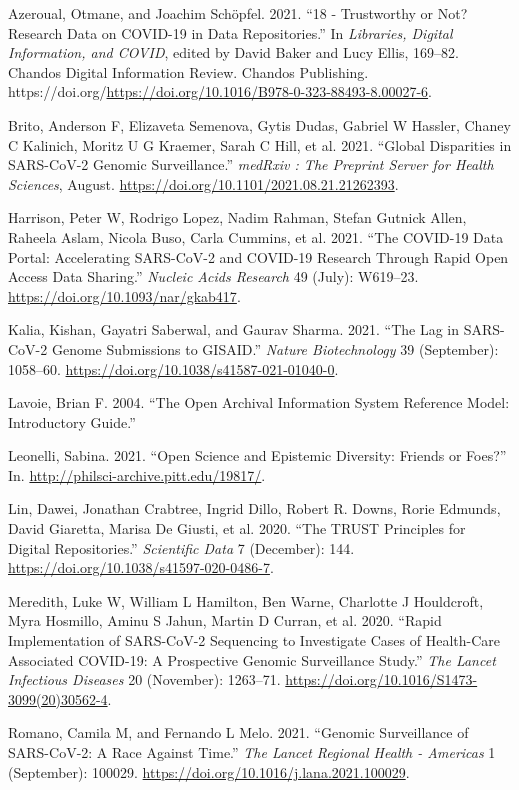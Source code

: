 \documentclass{article}
\newlength{\cslhangindent}
\newlength{\cslentryspacingunit} %
\newenvironment{CSLReferences}[2] %
 {%
  \setlength{\parindent}{0pt}
  \ifodd #1
  \let\oldpar\par
  \def\par{\hangindent=\cslhangindent\oldpar}
  \fi
  \setlength{\parskip}{#2\cslentryspacingunit}
 }%
 {}
\begin{document}
\hypertarget{refs}{}
\begin{CSLReferences}{1}{0}
\leavevmode\hypertarget{ref-AZEROUAL2021169}{}%
Azeroual, Otmane, and Joachim Schöpfel. 2021. {``18 - Trustworthy or
Not? Research Data on COVID-19 in Data Repositories.''} In
\emph{Libraries, Digital Information, and COVID}, edited by David Baker
and Lucy Ellis, 169--82. Chandos Digital Information Review. Chandos
Publishing.
https://doi.org/\url{https://doi.org/10.1016/B978-0-323-88493-8.00027-6}.

\leavevmode\hypertarget{ref-Brito2021}{}%
Brito, Anderson F, Elizaveta Semenova, Gytis Dudas, Gabriel W Hassler,
Chaney C Kalinich, Moritz U G Kraemer, Sarah C Hill, et al. 2021.
{``Global Disparities in SARS-CoV-2 Genomic Surveillance.''}
\emph{medRxiv : The Preprint Server for Health Sciences}, August.
\url{https://doi.org/10.1101/2021.08.21.21262393}.

\leavevmode\hypertarget{ref-Harrison2021}{}%
Harrison, Peter W, Rodrigo Lopez, Nadim Rahman, Stefan Gutnick Allen,
Raheela Aslam, Nicola Buso, Carla Cummins, et al. 2021. {``The COVID-19
Data Portal: Accelerating SARS-CoV-2 and COVID-19 Research Through Rapid
Open Access Data Sharing.''} \emph{Nucleic Acids Research} 49 (July):
W619--23. \url{https://doi.org/10.1093/nar/gkab417}.

\leavevmode\hypertarget{ref-Kalia2021}{}%
Kalia, Kishan, Gayatri Saberwal, and Gaurav Sharma. 2021. {``The Lag in
SARS-CoV-2 Genome Submissions to GISAID.''} \emph{Nature Biotechnology}
39 (September): 1058--60.
\url{https://doi.org/10.1038/s41587-021-01040-0}.

\leavevmode\hypertarget{ref-lavoie2004open}{}%
Lavoie, Brian F. 2004. {``The Open Archival Information System Reference
Model: Introductory Guide.''}

\leavevmode\hypertarget{ref-pittphilsci19817}{}%
Leonelli, Sabina. 2021. {``Open Science and Epistemic Diversity: Friends
or Foes?''} In. \url{http://philsci-archive.pitt.edu/19817/}.

\leavevmode\hypertarget{ref-Lin2020}{}%
Lin, Dawei, Jonathan Crabtree, Ingrid Dillo, Robert R. Downs, Rorie
Edmunds, David Giaretta, Marisa De Giusti, et al. 2020. {``The TRUST
Principles for Digital Repositories.''} \emph{Scientific Data} 7
(December): 144. \url{https://doi.org/10.1038/s41597-020-0486-7}.

\leavevmode\hypertarget{ref-Meredith2020}{}%
Meredith, Luke W, William L Hamilton, Ben Warne, Charlotte J Houldcroft,
Myra Hosmillo, Aminu S Jahun, Martin D Curran, et al. 2020. {``Rapid
Implementation of SARS-CoV-2 Sequencing to Investigate Cases of
Health-Care Associated COVID-19: A Prospective Genomic Surveillance
Study.''} \emph{The Lancet Infectious Diseases} 20 (November): 1263--71.
\url{https://doi.org/10.1016/S1473-3099(20)30562-4}.

\leavevmode\hypertarget{ref-Romano2021}{}%
Romano, Camila M, and Fernando L Melo. 2021. {``Genomic Surveillance of
SARS-CoV-2: A Race Against Time.''} \emph{The Lancet Regional Health -
Americas} 1 (September): 100029.
\url{https://doi.org/10.1016/j.lana.2021.100029}.

\end{CSLReferences}



\end{document}
